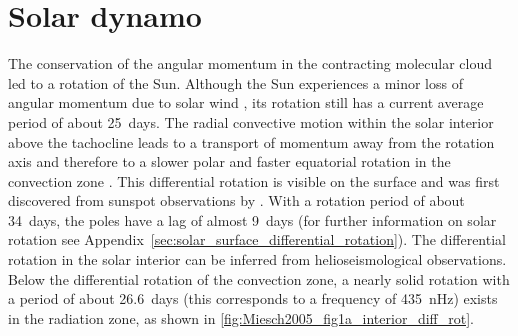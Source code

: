 \section{Solar dynamo}
\label{sec:solar_dynamo}
The conservation of the angular momentum in the contracting molecular cloud led to a rotation of the Sun. Although the Sun experiences a minor loss of angular momentum due to solar wind \citep{Weber1967}, its rotation still has a current average period of about 25~days. The radial convective motion within the solar interior above the tachocline leads to a transport of momentum away from the rotation axis and therefore to a slower polar and faster equatorial rotation in the convection zone \citep{Miesch2005}. This differential rotation is visible on the surface and was first discovered from sunspot observations by \citet{Scheiner1630}. With a rotation period of about 34~days, the poles have a lag of almost 9~days (for further information on solar rotation see Appendix~\ref{sec:solar_surface_differential_rotation}). The differential rotation in the solar interior can be inferred from helioseismological observations. Below the differential rotation of the convection zone, a nearly solid rotation with a period of about \SI{26.6}{days} (this corresponds to a frequency of \SI{435}{\nano\hertz}) exists in the radiation zone, as shown in \autoref{fig:Miesch2005_fig1a_interior_diff_rot}.
